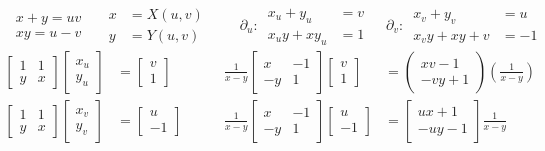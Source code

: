 \documentclass[twoside]{amsart}
\theoremstyle{plain}
\theoremstyle{definition}
\newcommand{\exercisehead}[1]
  {
   \noindent{\small\bf Exercise #1.}
   \smallskip}
\begin{document}
\exercisehead{1} 
\[
\begin{aligned}
  & x + y = uv \\
  & xy = u -v 
\end{aligned} \quad \,
\begin{aligned}
  x & = X(u,v) \\
  y & = Y(u,v)
\end{aligned}
\quad \quad \, 
\partial_u : \, \begin{aligned}
  x_u + y_u & = v \\
  x_u y + x y_u & = 1 
\end{aligned}
\quad \, \partial_v : \,  
\begin{aligned}
  x_v + y_v & = u \\
  x_v y + x y+v & = -1 
\end{aligned}
\]
\[
\begin{aligned}
  \left[ \begin{matrix} 1 & 1 \\ y & x \end{matrix} \right]\left[ \begin{matrix} x_u \\ y_u \end{matrix} \right] & = \left[ \begin{matrix} v \\ 1 \end{matrix} \right] \\
  \left[ \begin{matrix} 1 & 1 \\ y & x \end{matrix} \right]\left[ \begin{matrix} x_v \\ y_v \end{matrix} \right] & = \left[ \begin{matrix} u \\ -1 \end{matrix} \right]
\end{aligned} \quad \quad \, 
\begin{aligned}
  \frac{1}{ x- y} \left[ \begin{matrix} x &  -1 \\ -y & 1 \end{matrix} \right]\left[ \begin{matrix} v \\ 1 \end{matrix} \right] & = \left( \begin{matrix} xv - 1 \\ -vy + 1 \end{matrix} \right) \left( \frac{1}{x-y} \right) \\
  \frac{1}{x-y} \left[ \begin{matrix} x & -1 \\ - y & 1 \end{matrix} \right] \left[ \begin{matrix} u \\ -1 \end{matrix} \right] & = \left[ \begin{matrix} ux + 1 \\ -uy -1 \end{matrix} \right]\frac{1}{x-y}
\end{aligned}
\]
\end{document}

